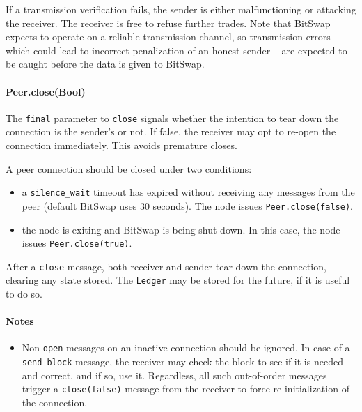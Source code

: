 \documentclass{sig-alternate}
\begin{document}
If a transmission verification fails, the sender is either malfunctioning or
attacking the receiver. The receiver is free to refuse further trades. Note
that BitSwap expects to operate on a reliable transmission channel, so
transmission errors -- which could lead to incorrect penalization of an honest
sender -- are expected to be caught before the data is given to BitSwap.

\paragraph{Peer.close(Bool)}

The \texttt{final} parameter to \texttt{close} signals whether the intention
to tear down the connection is the sender's or not. If false, the receiver
may opt to re-open the connection immediately. This avoids premature
closes.

A peer connection should be closed under two conditions:
\begin{itemize}
  \item a \texttt{silence\_wait} timeout has expired without receiving any
        messages from the peer (default BitSwap uses 30 seconds).
        The node issues \texttt{Peer.close(false)}.
  \item the node is exiting and BitSwap is being shut down.
        In this case, the node issues \texttt{Peer.close(true)}.
\end{itemize}

After a \texttt{close} message, both receiver and sender tear down the
connection, clearing any state stored. The \texttt{Ledger} may be stored for
the future, if it is useful to do so.

\paragraph{Notes}

\begin{itemize}
  \item Non-\texttt{open} messages on an inactive connection should be ignored.
        In case of a \texttt{send\_block} message, the receiver may check
        the block to see if it is needed and correct, and if so, use it.
        Regardless, all such out-of-order messages trigger a
        \texttt{close(false)} message from the receiver to force
        re-initialization of the connection.
\end{itemize}

\end{document}
